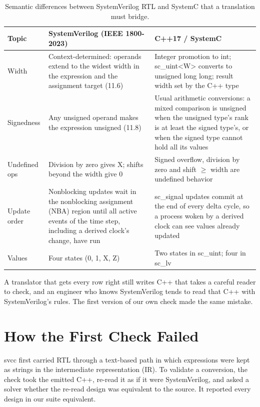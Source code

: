 \documentclass{ieeeaccess}
\newcommand{\code}[1]{{\fontshape{n}\ttfamily #1}}
\begin{document}
\begin{table}[t]
\centering
\caption{Semantic differences between SystemVerilog RTL and SystemC that a translation must bridge.}
\label{tab:diff}
\footnotesize
\setlength{\tabcolsep}{3pt}
\begin{tabularx}{\columnwidth}{@{}>{\raggedright\arraybackslash}p{} >{\raggedright\arraybackslash}X >{\raggedright\arraybackslash}X@{}}
\toprule
Topic & SystemVerilog (IEEE 1800-2023) & C++17 / SystemC \\
\midrule
Width & Context-determined: operands extend to the widest width in the expression and the assignment target (11.6) & Integer promotion to \code{int}; \code{sc\_uint<W>} converts to \code{unsigned long long}; result width set by the C++ type \\
Signedness & Any unsigned operand makes the expression unsigned (11.8) & Usual arithmetic conversions: a mixed comparison is unsigned when the unsigned type's rank is at least the signed type's, or when the signed type cannot hold all its values \\
Undefined ops & Division by zero gives X; shifts beyond the width give 0 & Signed overflow, division by zero and shift $\ge$ width are undefined behavior \\
Update order & Nonblocking updates wait in the nonblocking assignment (NBA) region until all active events of the time step, including a derived clock's change, have run & \code{sc\_signal} updates commit at the end of every delta cycle, so a process woken by a derived clock can see values already updated \\
Values & Four states (0, 1, X, Z) & Two states in \code{sc\_uint}; four in \code{sc\_lv} \\
\bottomrule
\end{tabularx}
\end{table}

A translator that gets every row right still writes C++ that takes a careful reader to check, and
an engineer who knows SystemVerilog tends to read that C++ with SystemVerilog's rules. The first
version of our own check made the same mistake.

\section{How the First Check Failed}
\label{sec:failure}

\code{svcc} first carried RTL through a text-based path in which expressions were kept as strings
in the intermediate representation (IR). To validate a conversion, the check took the emitted C++,
re-read it as if it were SystemVerilog, and asked a solver whether the re-read design was
equivalent to the source. It reported every design in our suite equivalent.
\end{document}
